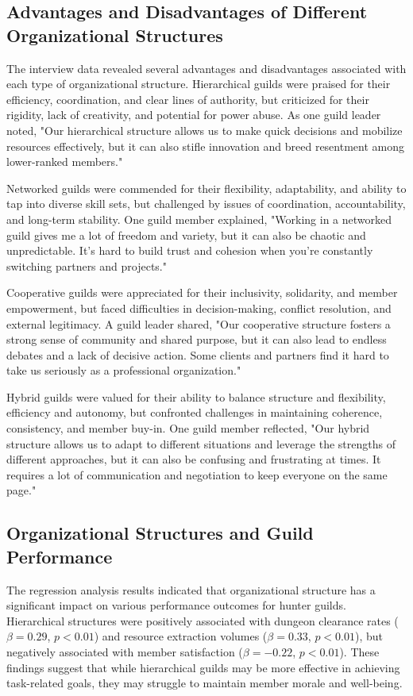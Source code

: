 \documentclass[12pt, a4paper]{article}
\begin{document}
\subsection{Advantages and Disadvantages of Different Organizational Structures}
The interview data revealed several advantages and disadvantages associated with each type of organizational structure. Hierarchical guilds were praised for their efficiency, coordination, and clear lines of authority, but criticized for their rigidity, lack of creativity, and potential for power abuse. As one guild leader noted, "Our hierarchical structure allows us to make quick decisions and mobilize resources effectively, but it can also stifle innovation and breed resentment among lower-ranked members."

Networked guilds were commended for their flexibility, adaptability, and ability to tap into diverse skill sets, but challenged by issues of coordination, accountability, and long-term stability. One guild member explained, "Working in a networked guild gives me a lot of freedom and variety, but it can also be chaotic and unpredictable. It's hard to build trust and cohesion when you're constantly switching partners and projects."

Cooperative guilds were appreciated for their inclusivity, solidarity, and member empowerment, but faced difficulties in decision-making, conflict resolution, and external legitimacy. A guild leader shared, "Our cooperative structure fosters a strong sense of community and shared purpose, but it can also lead to endless debates and a lack of decisive action. Some clients and partners find it hard to take us seriously as a professional organization."

Hybrid guilds were valued for their ability to balance structure and flexibility, efficiency and autonomy, but confronted challenges in maintaining coherence, consistency, and member buy-in. One guild member reflected, "Our hybrid structure allows us to adapt to different situations and leverage the strengths of different approaches, but it can also be confusing and frustrating at times. It requires a lot of communication and negotiation to keep everyone on the same page."

\subsection{Organizational Structures and Guild Performance}
The regression analysis results indicated that organizational structure has a significant impact on various performance outcomes for hunter guilds. Hierarchical structures were positively associated with dungeon clearance rates ($\beta = 0.29$, $p < 0.01$) and resource extraction volumes ($\beta = 0.33$, $p < 0.01$), but negatively associated with member satisfaction ($\beta = -0.22$, $p < 0.01$). These findings suggest that while hierarchical guilds may be more effective in achieving task-related goals, they may struggle to maintain member morale and well-being.
\end{document}
